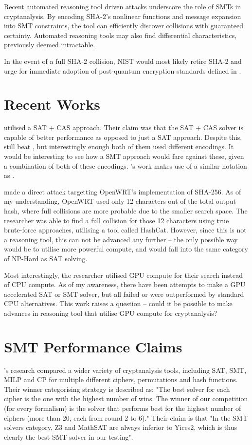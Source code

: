 \documentclass[a4paper]{report}
\begin{document}
Recent automated reasoning tool driven attacks underscore the role of SMTs in cryptanalysis.
By encoding SHA-2's nonlinear functions and message expansion into SMT constraints,
the tool can efficiently discover collisions with guaranteed certainty.
Automated reasoning tools may also find differential characteristics, previously deemed intractable.

In the event of a full SHA-2 collision, NIST would most likely retire SHA-2 and urge for immediate adoption of post-quantum encryption standards defined in \cite{NIST_PQC_2024}.

\section{Recent Works}
\cite{alamgir_2024} utilised a SAT + CAS approach.
Their claim was that the SAT + CAS solver is capable of better performance as opposed to just a SAT approach.
Despite this, \cite{li_2024} still beat \cite{alamgir_2024}, but interestingly enough both of them used different encodings.
It would be interesting to see how a SMT approach would fare against these, given a combination of both of these encodings.
\cite{alamgir_2024}'s work makes use of a similar notation as \cite{li_2024}.

\cite{flatt_2024} made a direct attack targetting OpenWRT's implementation of SHA-256.
As of my understanding, OpenWRT used only 12 characters out of the total output hash, where full collisions are more probable due to the smaller search space.
The researcher was able to find a full collision for those 12 characters using true brute-force approaches, utilising a tool called HashCat. \cite{hashcat}
However, since this is not a reasoning tool, this can not be advanced any further -- the only possible way would be to utilise more powerful compute,
and would fall into the same category of NP-Hard as SAT solving.

Most interestingly, the researcher utilised GPU compute for their search instead of CPU compute.
As of my awareness, there have been attempts to make a GPU accelerated SAT or SMT solver, but all failed or were outperformed by standard CPU alternatives. \cite{paraFROST}
This work raises a question -- could it be possible to make advances in reasoning tool that utilise GPU compute for cryptanalysis?

\section{SMT Performance Claims}
\label{sec:smt-performance-claims}
\cite{bellini_2024}'s research compared a wider variety of cryptanalysis tools, including SAT, SMT, MILP and CP for multiple different ciphers, permutations and hash functions.
Their winner categorising strategy is described as:
"The best solver for each cipher is the one with the highest number of wins.
The winner of our competition (for every formalism) is the solver that performs best for the highest number of ciphers (more than 20, each from round 2 to 6)."
Their claim is that "In the SMT solvers category, Z3 and MathSAT are always inferior to Yices2, which is thus clearly the best SMT solver in our testing".
\end{document}
